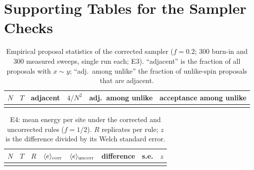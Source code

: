 \section{Supporting Tables for the Sampler Checks}\label{app:sampler-tables}
\begin{table}[t]
\centering\small
\caption{Empirical proposal statistics of the corrected sampler ($f=0.2$; $300$ burn-in and $300$ measured sweeps, single run each; E3). ``adjacent'' is the fraction of all proposals with $x\sim y$; ``adj.\ among unlike'' the fraction of unlike-spin proposals that are adjacent.}
\label{tab:adj}
\begin{tabular}{@{}rcccc c@{}}
\toprule
$N$ & $T$ & adjacent & $4/N^2$ & adj.\ among unlike & acceptance among unlike\\
\midrule
\\
\bottomrule
\end{tabular}
\end{table}

\begin{table}[t]
\centering\small
\caption{E4: mean energy per site under the corrected and uncorrected rules ($f=1/2$). $R$ replicates per rule; $z$ is the difference divided by its Welch standard error.}
\label{tab:impact}
\begin{tabular}{@{}rcrccccc@{}}
\toprule
$N$ & $T$ & $R$ & $\langle e\rangle_{\rm corr}$ & $\langle e\rangle_{\rm uncorr}$ & difference & s.e. & $z$\\
\midrule
\\
\bottomrule
\end{tabular}
\end{table}

